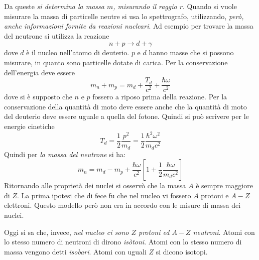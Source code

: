 Da queste \textit{si determina la massa $m$, misurando il raggio $r$}. Quando si
vuole misurare la massa di particelle neutre si usa lo spettrografo,
utilizzando, \textit{però, anche informazioni fornite da reazioni nucleari}. Ad
esempio per trovare la massa del neutrone si utilizza la reazione
\begin{equation}
n + p \longrightarrow d + \gamma
\end{equation}
dove $d$ è il nucleo nell'atomo di deuterio.
$p$ e $d$ hanno masse che si possono misurare, in quanto sono particelle dotate
di carica. Per la conservazione dell'energia deve essere
\begin{equation}
m_{n} + m_{p} = m_{d} + \dfrac{T_{d}}{c^{2}} + \dfrac{\hbar \omega}{c^{2}}
\end{equation}
dove si è supposto che $n$ e $p$ fossero a riposo prima della reazione. Per la
conservazione della quantità di moto deve essere anche che la quantità di moto
del deuterio deve essere uguale a quella del fotone. Quindi si può scrivere per
le energie cinetiche
\begin{equation}
T_{d} = \dfrac{1}{2} \dfrac{p^{2}}{m_{d}} = \dfrac{1}{2} \dfrac{\hbar ^{2} 
\omega ^{2}}{m_{d} c^{2}}
\end{equation}
Quindi per \textit{la massa del neutrone} si ha:
\begin{equation}
m_{n} = m_{d} - m_{p} + \dfrac{\hbar \omega}{c^{2}} \left[1 + \dfrac{1}{2} 
\dfrac{\hbar \omega}{m_{d} c^{2}} \right]
\end{equation}
Ritornando alle proprietà dei nuclei si osservò che la massa $A$ è sempre
maggiore di $Z$. La prima ipotesi che di fece fu che nel nucleo vi fossero $A$
protoni e $A-Z$ elettroni. Questo modello però non era in accordo con le misure
di massa dei nuclei.

Oggi si sa che, invece, \textit{nel nucleo ci sono $Z$ protoni ed $A-Z$
neutroni}. Atomi con lo stesso numero di neutroni di dirono \textit{isòtoni}.
Atomi con lo stesso numero di massa vengono detti \textit{isobari}. Atomi con
uguali $Z$ si dicono isotopi.

